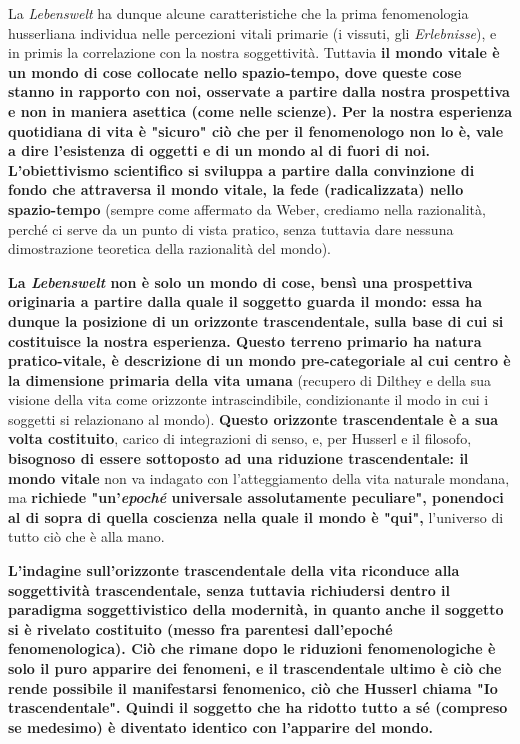 La \textit{Lebenswelt} ha dunque alcune caratteristiche che
la prima fenomenologia husserliana individua nelle percezioni
vitali primarie (i vissuti, gli \textit{Erlebnisse}), e in primis
la correlazione con la nostra soggettività. Tuttavia
\textbf{il mondo vitale è un mondo di cose collocate
nello spazio-tempo, dove queste cose stanno in
rapporto con noi, osservate a partire dalla nostra
prospettiva e non in maniera asettica (come nelle
scienze).
Per la nostra esperienza quotidiana di vita è
"sicuro" ciò che per il fenomenologo non lo è, vale
a dire l'esistenza di oggetti e di un mondo
al di fuori di noi. L'obiettivismo scientifico
si sviluppa a partire dalla convinzione di fondo
che attraversa il mondo vitale, la fede (radicalizzata) nello
spazio-tempo} (sempre come affermato da Weber, crediamo nella razionalità,  perché ci serve da un punto di vista pratico, senza tuttavia dare nessuna dimostrazione teoretica della razionalità del mondo).

 \textbf{La \textit{Lebenswelt} non è solo un mondo
di cose, bensì una prospettiva originaria a partire
dalla quale il soggetto guarda il mondo: essa
ha dunque la posizione di un orizzonte trascendentale,
sulla base di cui si costituisce la nostra esperienza.
Questo terreno primario ha natura pratico-vitale,
è descrizione di un mondo pre-categoriale al cui
centro è la dimensione primaria della vita umana}
(recupero di Dilthey e della sua visione della vita
come orizzonte intrascindibile, condizionante il
modo in cui i soggetti si relazionano al mondo).
\textbf{Questo orizzonte trascendentale è a sua volta
costituito}, carico di integrazioni di senso, e,
per Husserl e il filosofo, \textbf{bisognoso di essere sottoposto ad
una riduzione trascendentale: il mondo vitale}
non va indagato con l'atteggiamento della vita
naturale mondana, ma \textbf{richiede "un'\textit{epoché} universale
assolutamente peculiare", ponendoci al di sopra di
quella coscienza nella quale il mondo è "qui",}
l'universo di tutto ciò che è alla mano.

\textbf{L'indagine sull'orizzonte trascendentale della
vita riconduce alla soggettività trascendentale,
senza tuttavia richiudersi dentro il
paradigma soggettivistico della modernità, in
quanto anche il soggetto si è rivelato costituito
(messo fra parentesi dall'epoché fenomenologica).
Ciò che rimane dopo le riduzioni fenomenologiche è
solo il puro apparire dei fenomeni, e\textit{} il trascendentale
ultimo è ciò che rende possibile il manifestarsi
fenomenico, ciò che Husserl chiama "Io
trascendentale". Quindi il soggetto che ha ridotto
tutto a sé (compreso se medesimo) è diventato
identico con l'apparire del mondo.}

